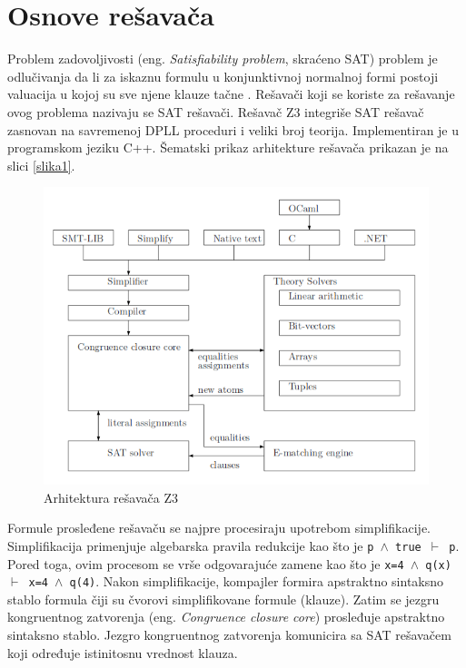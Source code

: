 \documentclass[12pt,oneside]{memoir}
\begin{document}
\section{Osnove rešavača}  \label{sec:num1}
Problem zadovoljivosti (eng. \textit{Satisfiability problem}, skraćeno SAT) problem je odlučivanja da li za iskaznu formulu u konjunktivnoj normalnoj formi postoji valuacija u kojoj su sve njene 
klauze tačne \cite{Handbook}. 
Rešavači koji se koriste za rešavanje ovog problema nazivaju se SAT rešavači.   
Rešavač Z3 integriše SAT rešavač zasnovan na savremenoj DPLL proceduri i veliki broj teorija. 
Implementiran je u programskom jeziku C++. Šematski prikaz arhitekture rešavača \cite{EfficientSMTSolver} prikazan je na slici \ref{slika1}. 
\begin{figure}[!ht]\label{slika1}
  \centering
  \includegraphics[width=1\textwidth]{arhitektura.png}
  \caption{Arhitektura rešavača Z3}
  \label{fig:arhitektura}
\end{figure}
\par
Formule prosleđene rešavaču se najpre procesiraju upotrebom simplifikacije. Simplifikacija primenjuje algebarska pravila redukcije kao što je \texttt{p $\land$ true $\vdash$ p}. Pored toga, ovim procesom se vrše odgovarajuće zamene kao što je \texttt{x=4 $\land$ q(x) $\vdash$ x=4 $\land$ q(4)}.
Nakon simplifikacije, kompajler formira apstraktno sintaksno stablo formula čiji su čvorovi simplifikovane formule (klauze). Zatim se jezgru kongruentnog zatvorenja (eng. 
\textit{Congruence closure core}) prosleđuje apstraktno sintaksno stablo. Jezgro kongruentnog zatvorenja komunicira sa SAT rešavačem koji određuje istinitosnu vrednost klauza. 
\par
\end{document}
